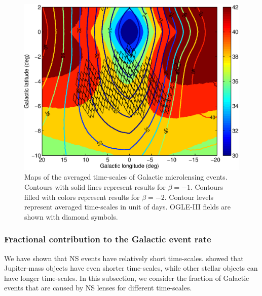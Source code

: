 \documentclass[iop,apj]{emulateapj}
\begin{document}
%
\begin{figure}
\begin{center}
  \includegraphics[width=3.5 in]{map_timescale.eps}
%
\caption{Maps of the averaged time-scales of Galactic microlensing events. Contours with solid
lines represent results for $\beta=-1$. Contours filled with colors represent results for $\beta=-2$.
Contour levels represent averaged time-scales in unit of days. OGLE-III fields are shown with diamond symbols. }
\label{map_timescale}
\end{center}
\end{figure}
%
%

\subsubsection{Fractional contribution to the Galactic event rate}


We have shown that NS events have relatively short time-scales. 
\citet{sumi11} showed that Jupiter-mass objects have even shorter time-scales,
while other stellar objects can have longer time-scales. In this subsection, we consider 
the fraction of Galactic events that are caused by NS lenses for different 
time-scales. 
\end{document}
